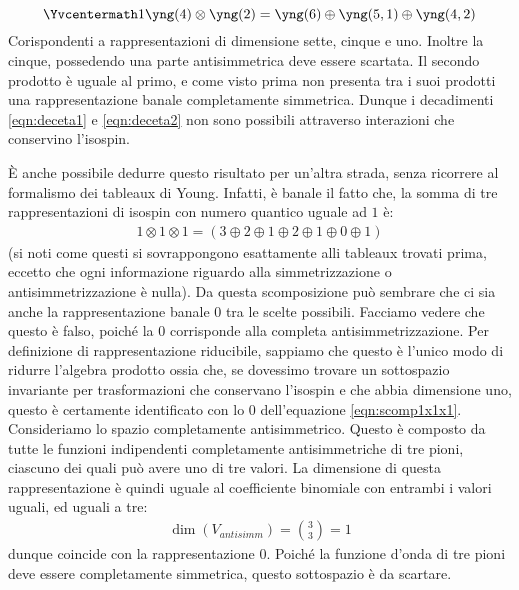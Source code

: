 \documentclass[../main.tex]{subfiles}
\begin{document}
\begin{svol}
		\begin{equation}
			\Yvcentermath1
			\yng(4)\otimes\yng(2)=\yng(6)\oplus\yng(5,1)\oplus\yng(4,2)
		\end{equation}
		Corispondenti a rappresentazioni di dimensione sette, cinque e uno. Inoltre la cinque, possedendo una parte antisimmetrica deve essere scartata. Il secondo prodotto è uguale al primo, e come visto prima non presenta tra i suoi prodotti una rappresentazione banale completamente simmetrica. Dunque i decadimenti \ref{eqn:deceta1} e \ref{eqn:deceta2} non sono possibili attraverso interazioni che conservino l'isospin.
		
		È anche possibile dedurre questo risultato per un'altra strada, senza ricorrere al formalismo dei tableaux di Young. Infatti, è banale il fatto che, la somma di tre rappresentazioni di isospin con numero quantico uguale ad $ 1 $ è:
		\begin{gather}
			\label{eqn:scomp1x1x1}
			1\otimes1\otimes1=(3\oplus2\oplus1\oplus2\oplus1\oplus0\oplus1)
		\end{gather}
		(si noti come questi si sovrappongono esattamente alli tableaux trovati prima, eccetto che ogni informazione riguardo alla simmetrizzazione o antisimmetrizzazione è nulla). Da questa scomposizione può sembrare che ci sia anche la rappresentazione banale 0 tra le scelte possibili. Facciamo vedere che questo è falso, poiché la 0 corrisponde alla completa antisimmetrizzazione. Per definizione di rappresentazione riducibile, sappiamo che questo è l'unico modo di ridurre l'algebra prodotto ossia che, se dovessimo trovare un sottospazio invariante per trasformazioni che conservano l'isospin e che abbia dimensione uno, questo è certamente identificato con lo 0 dell'equazione \ref{eqn:scomp1x1x1}. Consideriamo lo spazio completamente antisimmetrico. Questo è composto da tutte le funzioni indipendenti completamente antisimmetriche di tre pioni, ciascuno dei quali può avere uno di tre valori. La dimensione di questa rappresentazione è quindi uguale al coefficiente binomiale con entrambi i valori uguali, ed uguali a tre:
		\begin{gather*}
		\dim(V_{antisimm})=\binom{3}{3}=1
		\end{gather*}
		dunque coincide con la rappresentazione 0. Poiché la funzione d'onda di tre pioni deve essere completamente simmetrica, questo sottospazio è da scartare.
	\end{svol}
\end{document}
